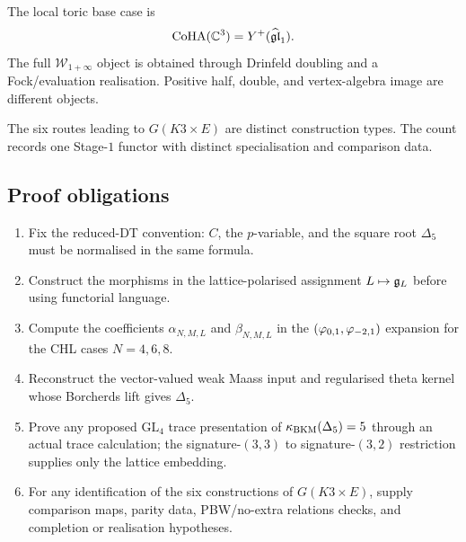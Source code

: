 The local toric base case is
\[
  \mathrm{CoHA}(\mathbb{C}^3)=Y^+(\widehat{\mathfrak{gl}}_1).
\]
The full $\mathcal W_{1+\infty}$ object is obtained through Drinfeld
doubling and a Fock/evaluation realisation.  Positive half, double, and
vertex-algebra image are different objects.

The six routes leading to $G(K3\times E)$ are distinct construction
types.  The count records one Stage-$1$ functor with distinct
specialisation and comparison data.

\subsection*{Proof obligations}

\begin{enumerate}
\item Fix the reduced-DT convention: $C$, the $p$-variable, and the
square root $\Delta_{5}$ must be normalised in the same formula.
\item Construct the morphisms in the lattice-polarised assignment
$L\mapsto\mathfrak{g}_L$ before using functorial language.
\item Compute the coefficients $\alpha_{N,M,L}$ and $\beta_{N,M,L}$ in
the $(\varphi_{0,1},\varphi_{-2,1})$ expansion for the CHL cases $N=4,6,8$.
\item Reconstruct the vector-valued weak Maass input and regularised
theta kernel whose Borcherds lift gives $\Delta_{5}$.
\item Prove any proposed $\mathrm{GL}_4$ trace presentation of
$\kappa_{\mathrm{BKM}}(\Delta_{5})=5$ through an actual trace calculation; the
signature-$(3,3)$ to signature-$(3,2)$ restriction supplies only the
lattice embedding.
\item For any identification of the six constructions of
$G(K3\times E)$, supply comparison maps, parity data, PBW/no-extra
relations checks, and completion or realisation hypotheses.
\end{enumerate}
